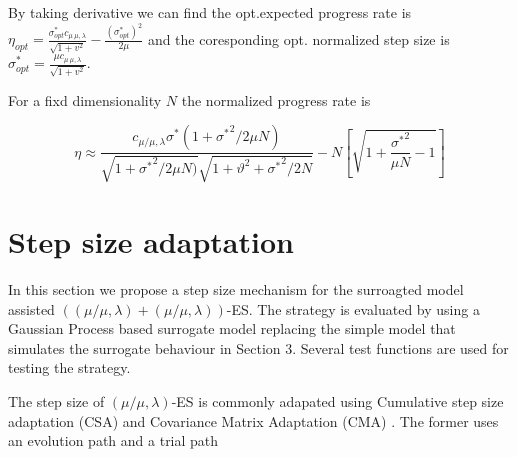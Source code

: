 By taking derivative we can find the opt.expected progress rate is $\eta_{opt} = \frac{\sigma^*_{opt} c_{\mu \ \mu, \lambda}}{\sqrt {1+ v^2}} - \frac{(\sigma^*_{opt})^2}{2 \mu}$ and the coresponding opt. normalized step size is $\sigma^*_{opt} = \frac{ \mu c_{\mu \ \mu, \lambda}}{\sqrt {1+ v^2}} $.


For a fixd dimensionality $N$ the normalized progress rate \cite{ARNOLD2002629} is 


$$
\eta \approx \frac{c_{\mu/\mu,\lambda} \sigma^* (1+{\sigma^*}^2 /2\mu N)}{\sqrt{ 1+{\sigma^*}^2 /2\mu N) } \sqrt{ 1+ \vartheta^2 +{\sigma^*}^2 /2N }} - N \left [ \sqrt{1+ \frac{ {\sigma^*}^2 }{\mu N} - 1} \right ] 
$$

\section{Step size adaptation}

In this section we propose a step size mechanism for the surroagted model assisted $((\mu/\mu,\lambda)+(\mu/\mu,\lambda))$-ES.  The strategy is evaluated by using a Gaussian Process based surrogate model replacing the simple model that simulates the surrogate behaviour in Section 3. Several test functions are used for testing the strategy.

The step size of $(\mu/\mu,\lambda)$-ES is commonly adapated using Cumulative step size adaptation (CSA) \cite{Ostermeier:1994:DAS:1326675.1326679} and Covariance Matrix Adaptation (CMA) \cite{Hansen:2003:RTC:772374.772376}. The former uses an evolution path and a trial path 




